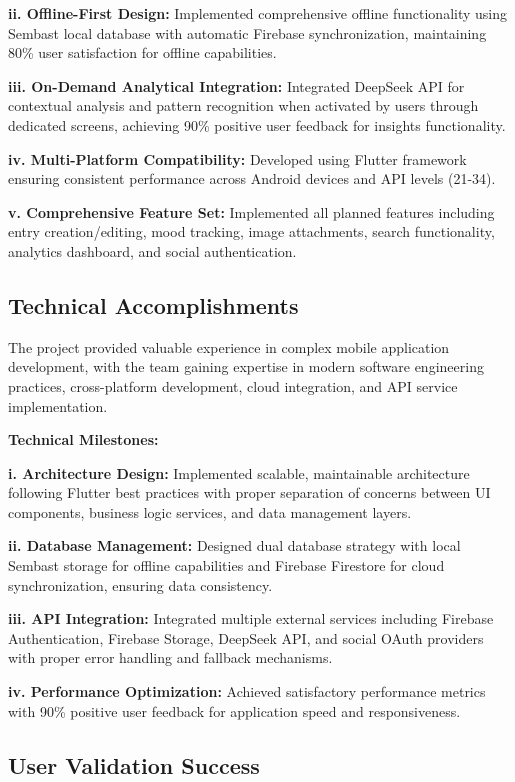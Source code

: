 \textbf{ii. Offline-First Design:} Implemented comprehensive offline functionality using Sembast local database with automatic Firebase synchronization, maintaining 80\% user satisfaction for offline capabilities.

\textbf{iii. On-Demand Analytical Integration:} Integrated DeepSeek API for contextual analysis and pattern recognition when activated by users through dedicated screens, achieving 90\% positive user feedback for insights functionality.

\textbf{iv. Multi-Platform Compatibility:} Developed using Flutter framework ensuring consistent performance across Android devices and API levels (21-34).

\textbf{v. Comprehensive Feature Set:} Implemented all planned features including entry creation/editing, mood tracking, image attachments, search functionality, analytics dashboard, and social authentication.

\subsection{Technical Accomplishments}

The project provided valuable experience in complex mobile application development, with the team gaining expertise in modern software engineering practices, cross-platform development, cloud integration, and API service implementation.

\textbf{Technical Milestones:}

\textbf{i. Architecture Design:} Implemented scalable, maintainable architecture following Flutter best practices with proper separation of concerns between UI components, business logic services, and data management layers.

\textbf{ii. Database Management:} Designed dual database strategy with local Sembast storage for offline capabilities and Firebase Firestore for cloud synchronization, ensuring data consistency.

\textbf{iii. API Integration:} Integrated multiple external services including Firebase Authentication, Firebase Storage, DeepSeek API, and social OAuth providers with proper error handling and fallback mechanisms.

\textbf{iv. Performance Optimization:} Achieved satisfactory performance metrics with 90\% positive user feedback for application speed and responsiveness.

\subsection{User Validation Success}

